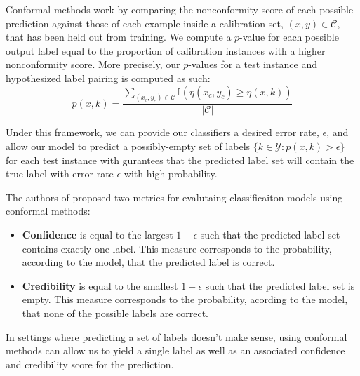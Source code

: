 \documentclass[11pt,letterpaper]{article}
\newcommand{\mc}{\mathcal}
\newcommand{\I}{\mathbb{I}}
\begin{document}
Conformal methods work by comparing the nonconformity score of each possible prediction against those of each example inside a calibration set, $(x, y) \in \mc{C}$, that has been held out from training. We compute a $p$-value for each possible output label equal to the proportion of calibration instances with a higher nonconformity score. More precisely, our $p$-values for a test instance
and hypothesized label pairing is computed as such:
\begin{equation}
  p(x, k) = \frac{\sum_{(x_c, y_c) \in \mc{C}} \I(\eta(x_c, y_c) \geq \eta(x, k))}{|\mc{C}|}
\end{equation}

Under this framework, we can provide our classifiers a desired error rate, $\epsilon$, and allow our model to predict a possibly-empty set of labels $\{k \in \mc{Y} : p(x, k) > \epsilon\}$ for each test instance with gurantees that the predicted label set will contain the true label with error rate $\epsilon$ with high probability.

The authors of \citet{saunders.1999} proposed two metrics for evalutaing classificaiton models using conformal methods:
\begin{itemize}
\item\textbf{Confidence} is equal to the largest $1 - \epsilon$ such that the predicted label set
  contains exactly one label. This measure corresponds to the probability, according to the model, that the predicted label is correct.
\item \textbf{Credibility} is equal to the smallest $1 - \epsilon$ such that the predicted label set is empty. This measure corresponds to the probability, acording to the model, that none of the possible labels are correct.
\end{itemize}

In settings where predicting a set of labels doesn't make sense, using conformal methods can allow us to yield a single label as well as an associated confidence and credibility score for the prediction.
\end{document}
